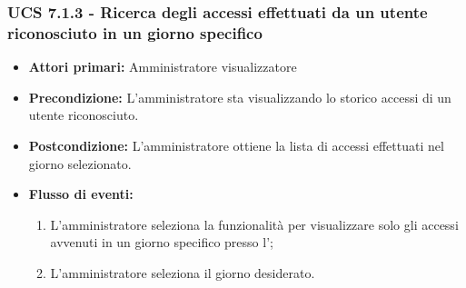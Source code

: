 \subsubsection{UCS 7.1.3 - Ricerca degli accessi effettuati da un utente riconosciuto in un giorno specifico}
\begin{itemize}
	\item \textbf{Attori primari:} Amministratore visualizzatore
	\item \textbf{Precondizione:} L'amministratore sta visualizzando lo storico accessi di un utente riconosciuto.
	\item \textbf{Postcondizione:} L'amministratore ottiene la lista di accessi effettuati nel giorno selezionato.
	\item \textbf{Flusso di eventi:}
	\begin{enumerate}
		\item L'amministratore seleziona la funzionalità per visualizzare solo gli accessi avvenuti in un giorno specifico presso l';
		\item L'amministratore seleziona il giorno desiderato.
	\end{enumerate}  
\end{itemize}


